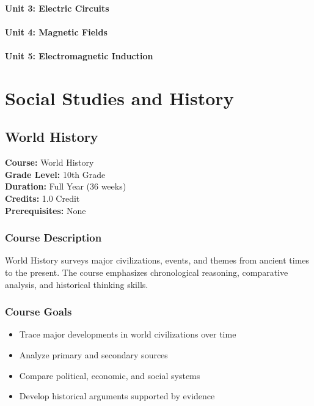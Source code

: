 \documentclass[12pt,oneside]{book}
\begin{document}
\subsection*{Unit 3: Electric Circuits}
\subsection*{Unit 4: Magnetic Fields}
\subsection*{Unit 5: Electromagnetic Induction}

\part{Social Studies and History}

\chapter{World History}

\noindent\textbf{Course:} World History\\
\textbf{Grade Level:} 10th Grade\\
\textbf{Duration:} Full Year (36 weeks)\\
\textbf{Credits:} 1.0 Credit\\
\textbf{Prerequisites:} None

\section{Course Description}
World History surveys major civilizations, events, and themes from ancient times to the present.
The course emphasizes chronological reasoning, comparative analysis, and historical thinking skills.

\section{Course Goals}
\begin{itemize}[leftmargin=2em]
    \item Trace major developments in world civilizations over time
    \item Analyze primary and secondary sources
    \item Compare political, economic, and social systems
    \item Develop historical arguments supported by evidence
\end{itemize}
\end{document}
